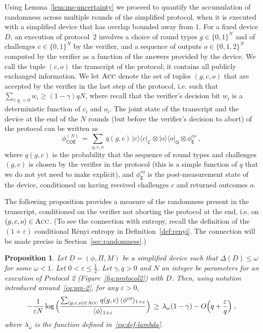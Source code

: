 \documentclass[11pt]{article}
\newtheorem{proposition}[theorem]{Proposition}
\theoremstyle{remark}
\theoremstyle{definition}
\newcommand{\ket}[1]{|#1\rangle}
\newcommand{\bra}[1]{\langle#1|}
\newcommand{\proj}[1]{\ket{#1}\!\bra{#1}}
\newcommand{\reg}[1]{{\textsf{#1}}}
\newcommand{\eps}{\varepsilon}
\newcommand{\Acc}{\textsc{Acc}}
\begin{document}
Using Lemma~\ref{lem:ms-uncertainty} we proceed to quantify the accumulation of randomness across multiple rounds of the simplified protocol, when it is executed with a simplified device that has overlap bounded away from $1$. For a fixed device $D$, an execution of protocol~2 involves a choice of round types $g\in\{0,1\}^N$ and of challenges $c\in\{0,1\}^N$ by the verifier, and a sequence of outputs $o\in\{0,1,2\}^N$ computed by the verifier as a function of the answers provided by the device. We call the tuple $(c,o)$ the transcript of the protocol; it contains all publicly exchanged information. We let $\Acc$ denote the set of tuples $(g,c,o)$ that are accepted by the verifier in the last step of the protocol, i.e. such that $\sum_{i: g_i=0} w_i \geq (1-\gamma)qN$, where recall that the verifier's decision bit $w_i$ is a deterministic function of $c_i$ and $o_i$. The joint state of the transcript and the device at the end of the $N$ rounds (but before the verifier's decision to abort) of the protocol can be written as
\begin{equation}\label{eq:pm-2}
 \phi^{(N)}_{\reg{COE}} \,=\, \sum_{g,c,o}\, q(g,c) \, \proj{c}_\reg{C} \otimes \proj{o}_\reg{O} \otimes \phi_\reg{E}^{co}\;,
\end{equation}
where $q(g,c)$ is the probability that the sequence of round types and challenges $(g,c)$ is chosen by the verifier in the protocol (this is a simple function of $q$ that we do not yet need to make explicit), and $ \phi_\reg{E}^{co}$ is the post-measurement state of the device, conditioned on having received challenges $c$ and returned outcomes $o$. 

The following proposition provides a measure of the randomness present in the transcript, conditioned on the verifier not aborting the protocol at the end, i.e. on $(g,c,o)\in\Acc$. (To see the connection with entropy, recall the definition of the $(1+\eps)$ conditional R\'enyi entropy in Definition~\ref{def:renyi}. The connection will be made precise in Section~\ref{sec:randomness}.)

\begin{proposition}\label{prop:d-rand}
Let $D = (\phi, \Pi, M)$ be a simplified device such that $\Delta(D)\leq \omega$ for some $\omega < 1$. Let $0<\eps \leq \frac{1}{2}$.  Let $\gamma,q>0$ and $N$ an integer be parameters for an execution of Protocol 2 (Figure~\ref{fig:protocol2}) with $D$. Then, using notation introduced around~\eqref{eq:pm-2}, for any $\eps>0$,
\begin{equation}\label{eq:d-rand-0}
- \frac{1}{\eps N} \log \Big( \frac{ \sum_{(g,c,o) \in \Acc} \,q(g,c)\, \langle \phi^{co} \rangle_{1+\eps}}{\langle \phi \rangle_{1+\eps} }\Big) \,\geq\,  \lambda_\omega(1-\gamma) - O\Big(q+\frac{\eps}{q}\Big)\;,
\end{equation}
where  $\lambda_\omega$ is the function defined in~\eqref{eq:def-lambda}.
\end{proposition}
\end{document}
